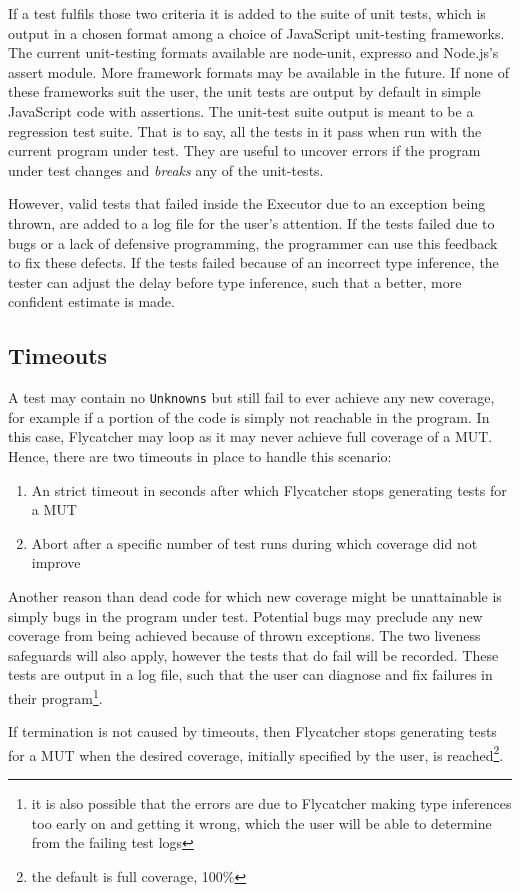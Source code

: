If a test fulfils those two criteria it is added to the suite of unit tests, which is output in a chosen format among a choice of JavaScript unit-testing frameworks. The current unit-testing formats available are \textsf{node-unit}, \textsf{expresso} and \textsf{Node.js}'s \textsf{assert} module. More framework formats may be available in the future. If none of these frameworks suit the user, the unit tests are output by default in simple JavaScript code with assertions. The unit-test suite output is meant to be a regression test suite. That is to say, all the tests in it pass when run with the current program under test. They are useful to uncover errors if the program under test changes and \emph{breaks} any of the unit-tests.

However, valid tests that failed inside the \textsf{Executor} due to an exception being thrown, are added to a log file for the user's attention. If the tests failed due to bugs or a lack of defensive programming, the programmer can use this feedback to fix these defects. If the tests failed because of an incorrect type inference, the tester can adjust the delay before type inference, such that a better, more confident estimate is made.

\subsection{Timeouts}
A test may contain no \texttt{Unknowns} but still fail to ever achieve any new coverage, for example if a portion of the code is simply not reachable in the program. In this case, \textsf{Flycatcher} may loop as it may never achieve full coverage of a MUT. Hence, there are two timeouts in place to handle this scenario:

\begin{enumerate}
   \item An strict timeout in seconds after which \textsf{Flycatcher} stops generating tests for a MUT
   \item Abort after a specific number of test runs during which coverage did not improve
\end{enumerate}

Another reason than dead code for which new coverage might be unattainable is simply bugs in the program under test. Potential bugs may preclude any new coverage from being achieved because of thrown exceptions. The two liveness safeguards will also apply, however the tests that do fail will be recorded. These tests are output in a log file, such that the user can diagnose and fix failures in their program\footnote{it is also possible that the errors are due to \textsf{Flycatcher} making type inferences too early on and getting it wrong, which the user will be able to determine from the failing test logs}.

If termination is not caused by timeouts, then \textsf{Flycatcher} stops generating tests for a MUT when the desired coverage, initially specified by the user, is reached\footnote{the default is full coverage, 100\%}. 